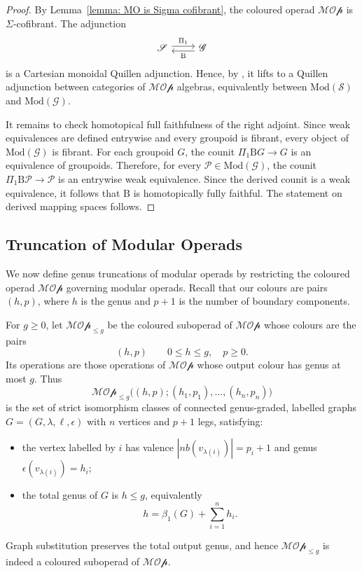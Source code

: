 \documentclass{amsart}
\newcommand{\sSet}{\mathscr{S}}
\newcommand{\Grpd}{\mathscr{G}}
\newcommand{\Mod}{\mathrm{Mod}}
\newcommand{\cs}{\mathrm{B}}
\newcommand{\nb}{nb}
\theoremstyle{definition}
\numberwithin{equation}{section}
\begin{document}
\begin{proof}
By Lemma~\ref{lemma: MO is Sigma cofibrant}, the coloured operad $\mathcal{MOp}$ is $\Sigma$-cofibrant. The adjunction
\[
\begin{tikzcd}
\sSet \arrow[r, shift left=1, "\Pi_{1}"] &
\Grpd \arrow[l, shift left=1, "\cs"]
\end{tikzcd}
\]
is a Cartesian monoidal Quillen adjunction. Hence, by \cite[Theorem~5.8]{hry_shrink}, it lifts to a Quillen adjunction between categories of $\mathcal{MOp}$ algebras, equivalently between $\Mod(\sSet)$ and $\Mod(\Grpd)$.

It remains to check homotopical full faithfulness of the right adjoint. Since weak equivalences are defined entrywise and every groupoid is fibrant, every object of $\Mod(\Grpd)$ is fibrant. For each groupoid $G$, the counit $\Pi_{1}\cs G\longrightarrow G$ is an equivalence of groupoids. Therefore, for every $\mathcal{P}\in\Mod(\Grpd)$, the counit $\Pi_{1}\cs\mathcal{P}\longrightarrow \mathcal{P}$ is an entrywise weak equivalence. Since the derived counit is a weak equivalence, it follows that $\cs$ is homotopically fully faithful. The statement on derived mapping spaces follows.
\end{proof}

\subsection{Truncation of Modular Operads}\label{subsec: truncations}

We now define genus truncations of modular operads by restricting the coloured operad $\mathcal{MOp}$ governing modular operads. Recall that our colours are
pairs $(h,p)$, where $h$ is the genus and $p+1$ is the number of boundary components.

For $g\geq 0$, let $\mathcal{MOp}_{\leq g}$ be the coloured suboperad of $\mathcal{MOp}$ whose colours are the pairs \[(h,p)\qquad 0\leq h\leq g,\quad p\geq 0.
\] Its operations are those operations of $\mathcal{MOp}$ whose output colour has genus at most $g$. Thus
\[
\mathcal{MOp}_{\leq g}\bigl((h,p);(h_1,p_1),\ldots,(h_n,p_n)\bigr)
\]
is the set of strict isomorphism classes of connected genus-graded, labelled graphs $G=(G,\lambda,\ell,\epsilon)$ with $n$ vertices and $p+1$ legs, satisfying:
\begin{itemize}
    \item the vertex labelled by $i$ has valence $|\nb(v_{\lambda(i)})|=p_i+1$ and genus $\epsilon(v_{\lambda(i)})=h_i$;
    \item the total genus of $G$ is $h\leq g$, equivalently
    \[
    h=\beta_1(G)+\sum_{i=1}^n h_i.
    \]
\end{itemize}
Graph substitution preserves the total output genus, and hence $\mathcal{MOp}_{\leq g}$ is indeed a coloured suboperad of $\mathcal{MOp}$.
\end{document}
